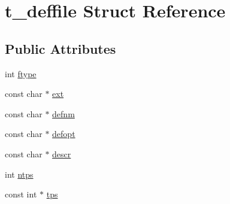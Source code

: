 \hypertarget{structt__deffile}{\section{t\-\_\-deffile \-Struct \-Reference}
\label{structt__deffile}
}
\subsection*{\-Public \-Attributes}
\begin{DoxyCompactItemize}
\item 
int \hyperlink{structt__deffile_a205b9fa1b7a616150530111af0b3b119}{ftype}
\item 
const char $\ast$ \hyperlink{structt__deffile_a946e2d8e109ea7c08d6d87f2823d6bc9}{ext}
\item 
const char $\ast$ \hyperlink{structt__deffile_a55c5f5d32b6c2ca8e8314aea835cb6f7}{defnm}
\item 
const char $\ast$ \hyperlink{structt__deffile_a427a5bfd1aeacf5491e2ce2109d35734}{defopt}
\item 
const char $\ast$ \hyperlink{structt__deffile_a56b8ce266b070da6607875d7d4de5e2d}{descr}
\item 
int \hyperlink{structt__deffile_ab8fd38479ff324f0fc3fda473c62bc2f}{ntps}
\item 
const int $\ast$ \hyperlink{structt__deffile_a70aad7ee8be48deb09bb7d1392ff42ab}{tps}
\end{DoxyCompactItemize}


